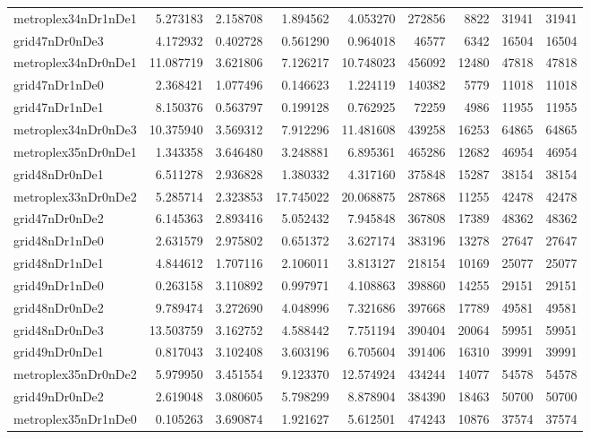 \begin{longtable}{|l|r|r|r|r|r|r|r|r|}
metroplex34nDr1nDe1 & 5.273183 & 2.158708 & 1.894562 & 4.053270 & 272856 & 8822 & 31941 & 31941 \\
grid47nDr0nDe3 & 4.172932 & 0.402728 & 0.561290 & 0.964018 & 46577 & 6342 & 16504 & 16504 \\
metroplex34nDr0nDe1 & 11.087719 & 3.621806 & 7.126217 & 10.748023 & 456092 & 12480 & 47818 & 47818 \\
grid47nDr1nDe0 & 2.368421 & 1.077496 & 0.146623 & 1.224119 & 140382 & 5779 & 11018 & 11018 \\
grid47nDr1nDe1 & 8.150376 & 0.563797 & 0.199128 & 0.762925 & 72259 & 4986 & 11955 & 11955 \\
metroplex34nDr0nDe3 & 10.375940 & 3.569312 & 7.912296 & 11.481608 & 439258 & 16253 & 64865 & 64865 \\
metroplex35nDr0nDe1 & 1.343358 & 3.646480 & 3.248881 & 6.895361 & 465286 & 12682 & 46954 & 46954 \\
grid48nDr0nDe1 & 6.511278 & 2.936828 & 1.380332 & 4.317160 & 375848 & 15287 & 38154 & 38154 \\
metroplex33nDr0nDe2 & 5.285714 & 2.323853 & 17.745022 & 20.068875 & 287868 & 11255 & 42478 & 42478 \\
grid47nDr0nDe2 & 6.145363 & 2.893416 & 5.052432 & 7.945848 & 367808 & 17389 & 48362 & 48362 \\
grid48nDr1nDe0 & 2.631579 & 2.975802 & 0.651372 & 3.627174 & 383196 & 13278 & 27647 & 27647 \\
grid48nDr1nDe1 & 4.844612 & 1.707116 & 2.106011 & 3.813127 & 218154 & 10169 & 25077 & 25077 \\
grid49nDr1nDe0 & 0.263158 & 3.110892 & 0.997971 & 4.108863 & 398860 & 14255 & 29151 & 29151 \\
grid48nDr0nDe2 & 9.789474 & 3.272690 & 4.048996 & 7.321686 & 397668 & 17789 & 49581 & 49581 \\
grid48nDr0nDe3 & 13.503759 & 3.162752 & 4.588442 & 7.751194 & 390404 & 20064 & 59951 & 59951 \\
grid49nDr0nDe1 & 0.817043 & 3.102408 & 3.603196 & 6.705604 & 391406 & 16310 & 39991 & 39991 \\
metroplex35nDr0nDe2 & 5.979950 & 3.451554 & 9.123370 & 12.574924 & 434244 & 14077 & 54578 & 54578 \\
grid49nDr0nDe2 & 2.619048 & 3.080605 & 5.798299 & 8.878904 & 384390 & 18463 & 50700 & 50700 \\
metroplex35nDr1nDe0 & 0.105263 & 3.690874 & 1.921627 & 5.612501 & 474243 & 10876 & 37574 & 37574 \\

\end{longtable}
